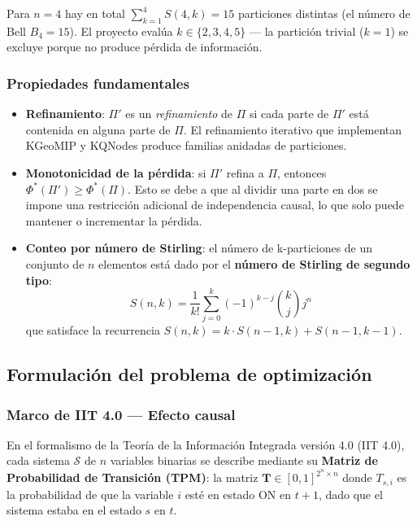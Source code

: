 Para $n = 4$ hay en total $\sum_{k=1}^{4} S(4,k) = 15$ particiones distintas (el número de Bell
$B_4 = 15$). El proyecto evalúa $k \in \{2, 3, 4, 5\}$ — la partición trivial ($k=1$) se
excluye porque no produce pérdida de información.

\subsubsection*{Propiedades fundamentales}

\begin{itemize}
  \item \textbf{Refinamiento}: $\Pi'$ es un \textit{refinamiento} de $\Pi$ si cada parte de
        $\Pi'$ está contenida en alguna parte de $\Pi$. El refinamiento iterativo que implementan
        KGeoMIP y KQNodes produce familias anidadas de particiones.

  \item \textbf{Monotonicidad de la pérdida}: si $\Pi'$ refina a $\Pi$, entonces
        $\Phi^*(\Pi') \geq \Phi^*(\Pi)$. Esto se debe a que al dividir una parte en dos se
        impone una restricción adicional de independencia causal, lo que solo puede mantener
        o incrementar la pérdida.

  \item \textbf{Conteo por número de Stirling}: el número de k-particiones de un conjunto de
        $n$ elementos está dado por el \textbf{número de Stirling de segundo tipo}:
        \begin{equation}
          S(n, k) = \frac{1}{k!} \sum_{j=0}^{k} (-1)^{k-j} \binom{k}{j} j^n
          \label{eq:stirling}
        \end{equation}
        que satisface la recurrencia $S(n,k) = k \cdot S(n-1,k) + S(n-1,k-1)$.
\end{itemize}

\subsection{Formulación del problema de optimización}

\subsubsection*{Marco de IIT 4.0 — Efecto causal}

En el formalismo de la Teoría de la Información Integrada versión 4.0 (IIT 4.0), cada sistema
$\mathcal{S}$ de $n$ variables binarias se describe mediante su \textbf{Matriz de Probabilidad
de Transición (TPM)}: la matriz $\mathbf{T} \in [0,1]^{2^n \times n}$ donde $T_{s,i}$ es la
probabilidad de que la variable $i$ esté en estado ON en $t+1$, dado que el sistema estaba en
el estado $s$ en $t$.


